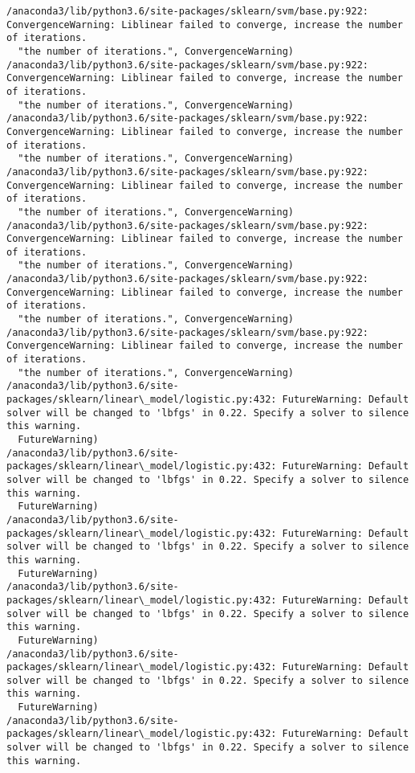 \documentclass[11pt]{article}
\begin{document}
\begin{Verbatim}[commandchars=\\\{\}]
/anaconda3/lib/python3.6/site-packages/sklearn/svm/base.py:922: ConvergenceWarning: Liblinear failed to converge, increase the number of iterations.
  "the number of iterations.", ConvergenceWarning)
/anaconda3/lib/python3.6/site-packages/sklearn/svm/base.py:922: ConvergenceWarning: Liblinear failed to converge, increase the number of iterations.
  "the number of iterations.", ConvergenceWarning)
/anaconda3/lib/python3.6/site-packages/sklearn/svm/base.py:922: ConvergenceWarning: Liblinear failed to converge, increase the number of iterations.
  "the number of iterations.", ConvergenceWarning)
/anaconda3/lib/python3.6/site-packages/sklearn/svm/base.py:922: ConvergenceWarning: Liblinear failed to converge, increase the number of iterations.
  "the number of iterations.", ConvergenceWarning)
/anaconda3/lib/python3.6/site-packages/sklearn/svm/base.py:922: ConvergenceWarning: Liblinear failed to converge, increase the number of iterations.
  "the number of iterations.", ConvergenceWarning)
/anaconda3/lib/python3.6/site-packages/sklearn/svm/base.py:922: ConvergenceWarning: Liblinear failed to converge, increase the number of iterations.
  "the number of iterations.", ConvergenceWarning)
/anaconda3/lib/python3.6/site-packages/sklearn/svm/base.py:922: ConvergenceWarning: Liblinear failed to converge, increase the number of iterations.
  "the number of iterations.", ConvergenceWarning)
/anaconda3/lib/python3.6/site-packages/sklearn/linear\_model/logistic.py:432: FutureWarning: Default solver will be changed to 'lbfgs' in 0.22. Specify a solver to silence this warning.
  FutureWarning)
/anaconda3/lib/python3.6/site-packages/sklearn/linear\_model/logistic.py:432: FutureWarning: Default solver will be changed to 'lbfgs' in 0.22. Specify a solver to silence this warning.
  FutureWarning)
/anaconda3/lib/python3.6/site-packages/sklearn/linear\_model/logistic.py:432: FutureWarning: Default solver will be changed to 'lbfgs' in 0.22. Specify a solver to silence this warning.
  FutureWarning)
/anaconda3/lib/python3.6/site-packages/sklearn/linear\_model/logistic.py:432: FutureWarning: Default solver will be changed to 'lbfgs' in 0.22. Specify a solver to silence this warning.
  FutureWarning)
/anaconda3/lib/python3.6/site-packages/sklearn/linear\_model/logistic.py:432: FutureWarning: Default solver will be changed to 'lbfgs' in 0.22. Specify a solver to silence this warning.
  FutureWarning)
/anaconda3/lib/python3.6/site-packages/sklearn/linear\_model/logistic.py:432: FutureWarning: Default solver will be changed to 'lbfgs' in 0.22. Specify a solver to silence this warning.

\end{Verbatim}
\end{document}
